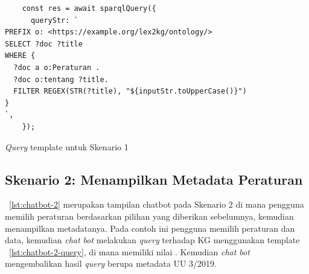 \begin{listing}[H]
  \begin{verbatim}
    const res = await sparqlQuery({
      queryStr: `
PREFIX o: <https://example.org/lex2kg/ontology/>
SELECT ?doc ?title
WHERE {
  ?doc a o:Peraturan .
  ?doc o:tentang ?title.
  FILTER REGEX(STR(?title), "${inputStr.toUpperCase()}")
}
`,
    });
  \end{verbatim}
  \caption{\textit{Query} template untuk Skenario 1}
  \label{lst:chatbot-1-query}
\end{listing}

\subsection{Skenario 2: Menampilkan Metadata Peraturan}
\label{subsec:skenario-2}

\lst~\ref{lst:chatbot-2} merupakan tampilan chatbot pada Skenario 2 di mana pengguna memilih
peraturan berdasarkan pilihan yang diberikan sebelumnya, kemudian menampilkan metadatanya. Pada
contoh ini pengguna memilih peraturan  dan data, kemudian
\textit{chat bot} melakukan \textit{query} terhadap KG menggunakan template
\lst~\ref{lst:chatbot-2-query}, di mana  memiliki nilai . Kemudian
\textit{chat bot} mengembalikan hasil \textit{query} berupa metadata UU 3/2019.

